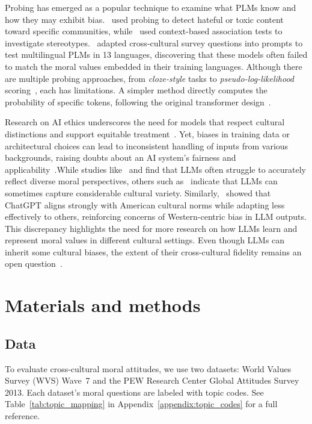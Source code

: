 \documentclass[11pt]{article}
\begin{document}
Probing has emerged as a popular technique to examine what PLMs know and how they may exhibit bias.~\citet{Ousidhoum2021} used probing to detect hateful or toxic content toward specific communities, while~\citet{nadeem2021stereoset} used context-based association tests to investigate stereotypes.~\citet{arora2023probing} adapted cross-cultural survey questions into prompts to test multilingual PLMs in 13 languages, discovering that these models often failed to match the moral values embedded in their training languages. Although there are multiple probing approaches, from \emph{cloze-style} tasks to \emph{pseudo-log-likelihood} scoring~\citep{nadeem2021stereoset, Salazar2019}, each has limitations. A simpler method directly computes the probability of specific tokens, following the original transformer design~\citep{Vaswani2017}.

Research on AI ethics underscores the need for models that respect cultural distinctions and support equitable treatment~\citep{ Zowghi2023, CachatRosset2023, karpouzis2024, meijer2024}. Yet, biases in training data or architectural choices can lead to inconsistent handling of inputs from various backgrounds, raising doubts about an AI system’s fairness and applicability~\citep{karpouzis2024}.While studies like~\citet{arora2023probing} and \citet{Benkler2023} find that LLMs often struggle to accurately reflect diverse moral perspectives, others such as~\citet{ramezani2023knowledge} indicate that LLMs can sometimes capture considerable cultural variety. Similarly,~\citet{cao2023assessing} showed that ChatGPT aligns strongly with American cultural norms while adapting less effectively to others, reinforcing concerns of Western-centric bias in LLM outputs. This discrepancy highlights the need for more research on how LLMs learn and represent moral values in different cultural settings. Even though LLMs can inherit some cultural biases, the extent of their cross-cultural fidelity remains an open question~\citep{caliskan2017semantics}.

\section{Materials and methods}
\subsection{Data}
\label{sec:data}

To evaluate cross-cultural moral attitudes, we use two datasets: World Values Survey (WVS) Wave~7 and the PEW Research Center Global Attitudes Survey 2013. Each dataset’s moral questions are labeled with topic codes. See Table~\ref{tab:topic_mapping} in Appendix~\ref{appendix:topic_codes} for a full reference.
\end{document}
